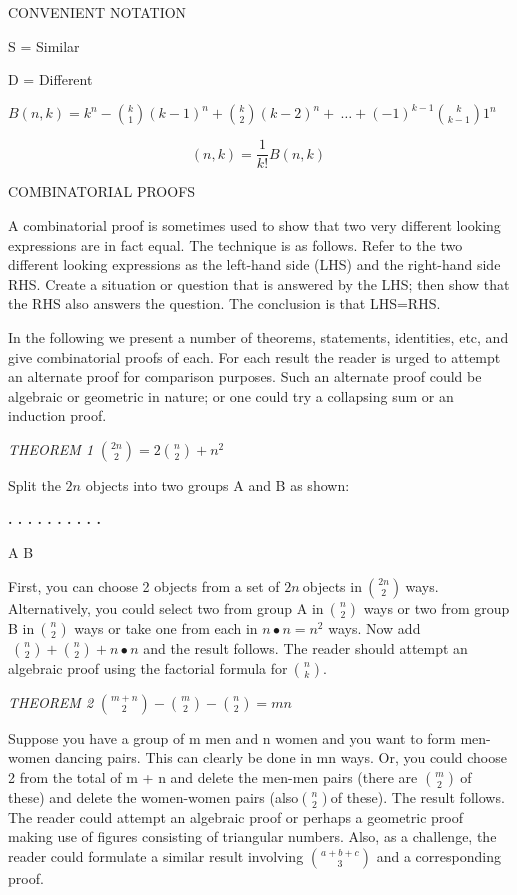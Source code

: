 CONVENIENT NOTATION

S = Similar

D = Different

\(B\left( n,k \right) = k^{n} -
\binom{k}{1}
\left( k - 1 \right)^{n} +
\binom{k}{2}
\left( k - 2 \right)^{n} + \ \ldots + \left( - 1 \right)^{k - 1}
\binom{k}{k - 1}
1^{n}\)

\[
\left( n,k \right) = \frac{1}{k!}B\left( n,k \right)\
\]

COMBINATORIAL PROOFS

A combinatorial proof is sometimes used to show that two very different
looking expressions are in fact equal. The technique is as follows.
Refer to the two different looking expressions as the left-hand side
(LHS) and the right-hand side RHS. Create a situation or question that
is answered by the LHS; then show that the RHS also answers the
question. The conclusion is that LHS=RHS.

In the following we present a number of theorems, statements,
identities, etc, and give combinatorial proofs of each. For each result
the reader is urged to attempt an alternate proof for comparison
purposes. Such an alternate proof could be algebraic or geometric in
nature; or one could try a collapsing sum or an induction proof.

\emph{THEOREM 1} \(\binom{2n}{2}
 = 2
\binom{n}{2}
 + n^{2}\)

Split the \(2n\) objects into two groups A and B as shown:

\textbf{. . . . . . . . . . }

A B

First, you can choose 2 objects from a set of \(2n\ \)objects
in\(\
\binom{2n}{2}
\ \)ways. Alternatively, you could select two from group A
in\(\
\binom{n}{2}
\) ways or two from group B in\(\
\binom{n}{2}
\) ways or take one from each in \(n \bullet n = n^{2}\)
ways. Now add\(\
\binom{n}{2}
 +
\binom{n}{2}
 + n \bullet n\) and the result follows. The reader should
attempt an algebraic proof using the factorial formula
for\(\
\binom{n}{k}
\).

\emph{THEOREM 2} \(\binom{m + n}{2}
 -
\binom{m}{2}
 -
\binom{n}{2}
 = mn\)

Suppose you have a group of m men and n women and you want to form
men-women dancing pairs. This can clearly be done in mn ways. Or, you
could choose 2 from the total of m + n and delete the men-men pairs
(there are \(\binom{m}{2}
\ \)of these) and delete the women-women pairs
(also\(\binom{n}{2}
\)of these). The result follows. The reader could attempt
an algebraic proof or perhaps a geometric proof making use of figures
consisting of triangular numbers. Also, as a challenge, the reader could
formulate a similar result involving \(\binom{a + b + c}{3}
\) and a corresponding proof.

